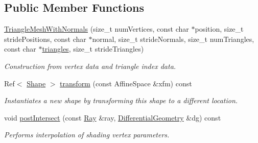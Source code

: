 \subsection*{Public Member Functions}
\begin{DoxyCompactItemize}
\item 
\hyperlink{classembree_1_1_triangle_mesh_with_normals_a91adf7cab2b275f3db5b46a500ddd6a0}{TriangleMeshWithNormals} (size\_\-t numVertices, const char $\ast$position, size\_\-t stridePositions, const char $\ast$normal, size\_\-t strideNormals, size\_\-t numTriangles, const char $\ast$\hyperlink{classembree_1_1_triangle_mesh_with_normals_ae98a0f001155d29277e327eab98f2992}{triangles}, size\_\-t strideTriangles)
\begin{DoxyCompactList}\small\item\em Construction from vertex data and triangle index data. \item\end{DoxyCompactList}\item 
Ref$<$ \hyperlink{classembree_1_1_shape}{Shape} $>$ \hyperlink{classembree_1_1_triangle_mesh_with_normals_adab234358ea31808f2670aa9175f1a83}{transform} (const AffineSpace \&xfm) const 
\begin{DoxyCompactList}\small\item\em Instantiates a new shape by transforming this shape to a different location. \item\end{DoxyCompactList}\item 
void \hyperlink{classembree_1_1_triangle_mesh_with_normals_a7f3c8da7379f312f423ba6846c7daa5c}{postIntersect} (const \hyperlink{structembree_1_1_ray}{Ray} \&ray, \hyperlink{structembree_1_1_differential_geometry}{DifferentialGeometry} \&dg) const 
\begin{DoxyCompactList}\small\item\em Performs interpolation of shading vertex parameters. \item\end{DoxyCompactList}\end{DoxyCompactItemize}
